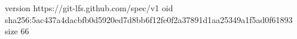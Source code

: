 version https://git-lfs.github.com/spec/v1
oid sha256:5ac437a4dacbfb0d5920ed7d8bb6f12fe0f2a37891d1aa25349a1f5ad0f61893
size 66
